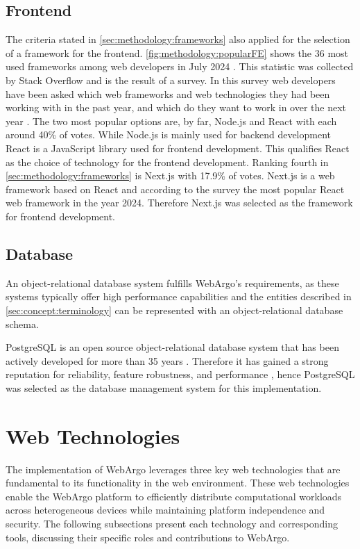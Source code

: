 \subsection{Frontend}
\label{subsec:methodology:frameworks:frontend}
The criteria stated in \autoref{sec:methodology:frameworks} also applied for the selection of a framework for the frontend. \autoref{fig:methodology:popularFE} shows the 36 most used frameworks among web developers in July 2024 \cite{frontend:popularity}. This statistic was collected by Stack Overflow and is the result of a survey. In this survey web developers have been asked which web frameworks and web technologies they had been working with in the past year, and which do they want to work in over the next year \cite{frontend:popularity}. The two most popular options are, by far, Node.js and React with each around 40\% of votes. While Node.js is mainly used for backend development React is a JavaScript library used for frontend development. This qualifies React as the choice of technology for the frontend development. Ranking fourth in \autoref{sec:methodology:frameworks} is Next.js with 17.9\% of votes. Next.js is a web framework based on React \cite{methodology:nextjs} and according to the survey the most popular React web framework in the year 2024. Therefore Next.js was selected as the framework for frontend development.

\subsection{Database}
An object-relational database system fulfills WebArgo's requirements, as these systems typically offer high performance capabilities and the entities described in \autoref{sec:concept:terminology} can be represented with an object-relational database schema.

PostgreSQL is an open source object-relational database system that has been actively developed for more than 35 years \cite{methodology:db}. Therefore it has gained a strong reputation for reliability, feature robustness, and performance \cite{methodology:db}, hence PostgreSQL was selected as the database management system for this implementation.

\section{Web Technologies}
\label{sec:methodology:technologies}
The implementation of WebArgo leverages three key web technologies that are fundamental to its functionality in the web environment. These web technologies enable the WebArgo platform to efficiently distribute computational workloads across heterogeneous devices while maintaining platform independence and security. The following subsections present each technology and corresponding tools, discussing their specific roles and contributions to WebArgo.


